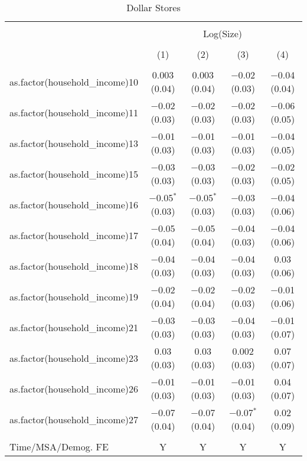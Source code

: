 
\begin{table}[!htbp] \centering 
  \caption{Dollar Stores} 
  \label{tab:packageSizeDollarTamponappendix} 
\begin{tabular}{@{\extracolsep{5pt}}lcccc} 
\\[-1.8ex]\hline 
\hline \\[-1.8ex] 
 & \multicolumn{4}{c}{Log(Size)} \\ 
\\[-1.8ex] & (1) & (2) & (3) & (4)\\ 
\hline \\[-1.8ex] 
 as.factor(household\_income)10 & 0.003 (0.04) & 0.003 (0.04) & $-$0.02 (0.03) & $-$0.04 (0.04) \\ 
  as.factor(household\_income)11 & $-$0.02 (0.03) & $-$0.02 (0.03) & $-$0.02 (0.03) & $-$0.06 (0.05) \\ 
  as.factor(household\_income)13 & $-$0.01 (0.03) & $-$0.01 (0.03) & $-$0.01 (0.03) & $-$0.04 (0.05) \\ 
  as.factor(household\_income)15 & $-$0.03 (0.03) & $-$0.03 (0.03) & $-$0.02 (0.03) & $-$0.02 (0.05) \\ 
  as.factor(household\_income)16 & $-$0.05$^{*}$ (0.03) & $-$0.05$^{*}$ (0.03) & $-$0.03 (0.03) & $-$0.04 (0.06) \\ 
  as.factor(household\_income)17 & $-$0.05 (0.04) & $-$0.05 (0.04) & $-$0.04 (0.03) & $-$0.04 (0.06) \\ 
  as.factor(household\_income)18 & $-$0.04 (0.03) & $-$0.04 (0.03) & $-$0.04 (0.03) & 0.03 (0.06) \\ 
  as.factor(household\_income)19 & $-$0.02 (0.04) & $-$0.02 (0.04) & $-$0.02 (0.03) & $-$0.01 (0.06) \\ 
  as.factor(household\_income)21 & $-$0.03 (0.03) & $-$0.03 (0.03) & $-$0.04 (0.03) & $-$0.01 (0.07) \\ 
  as.factor(household\_income)23 & 0.03 (0.03) & 0.03 (0.03) & 0.002 (0.03) & 0.07 (0.07) \\ 
  as.factor(household\_income)26 & $-$0.01 (0.03) & $-$0.01 (0.03) & $-$0.01 (0.03) & 0.04 (0.07) \\ 
  as.factor(household\_income)27 & $-$0.07 (0.04) & $-$0.07 (0.04) & $-$0.07$^{*}$ (0.04) & 0.02 (0.09) \\ 
 \hline \\[-1.8ex] 
Time/MSA/Demog. FE & Y & Y & Y & Y \\ 

\end{tabular}
\end{table}
